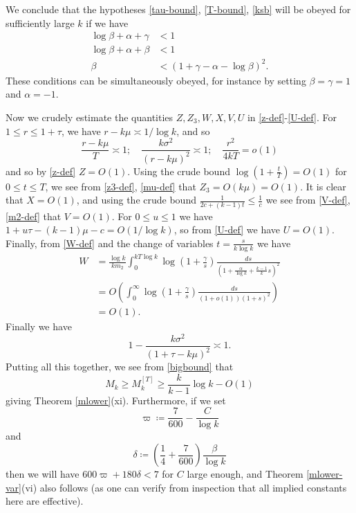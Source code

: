 \documentclass{bmcart}
\theoremstyle{plain}
\theoremstyle{definition}
\renewcommand{\sim}{\asymp}
\begin{document}
We conclude that the hypotheses \eqref{tau-bound}, \eqref{T-bound}, \eqref{ksb} will be obeyed for sufficiently large $k$ if we have
\begin{align*}
\log \beta + \alpha + \gamma &< 1 \\
\log \beta + \alpha + \beta &< 1 \\
\beta &< (1 + \gamma - \alpha - \log \beta)^2.
\end{align*}
These conditions can be simultaneously obeyed, for instance by setting $\beta=\gamma=1$ and $\alpha = -1$.

Now we crudely estimate the quantities $Z,Z_3,W,X,V,U$ in \eqref{z-def}-\eqref{U-def}.  For $1 \leq r \leq 1+\tau$, we have $r-k\mu \sim 1/\log k$, and so
$$ \frac{r-k\mu}{T} \sim 1; \quad \frac{k \sigma^2}{(r-k\mu)^2} \sim 1; \quad \frac{r^2}{4kT} = o(1)$$
and so by \eqref{z-def} $Z = O(1)$.  Using the crude bound $\log(1+\frac{t}{T}) = O(1)$ for $0 \leq t \leq T$, we see from \eqref{z3-def}, \eqref{mu-def} that $Z_3 = O( k \mu ) = O(1)$.  It is clear that $X = O(1)$, and using the crude bound $\frac{1}{2c+(k-1)t} \leq \frac{1}{c}$ we see from \eqref{V-def}, \eqref{m2-def} that $V = O(1)$.  For $0 \leq u \leq 1$ we have $1 + u\tau - (k-1)\mu - c = O(1/\log k)$, so from \eqref{U-def} we have $U=O(1)$.  Finally, from \eqref{W-def} and the change of variables $t = \frac{s}{k \log k}$ we have
\begin{align*}
W &= \frac{\log k}{k m_2} \int_0^{kT\log k} \log\left(1 + \frac{\gamma}{s}\right) \frac{ds}{(1 + \frac{\alpha}{\log k} + \frac{k-1}{k} s)^2} \\
&= O\left( \int_0^\infty \log\left(1+\frac{\gamma}{s}\right) \frac{ds}{(1+o(1))(1+s)^2} \right) \\
&= O(1).
\end{align*}
Finally we have
$$ 1 - \frac{k\sigma^2}{(1+\tau-k\mu)^2} \sim 1.$$
Putting all this together, we see from \eqref{bigbound} that
$$  M_k \geq M_k^{[T]} \geq \frac{k}{k-1} \log k -  O(1)$$
giving Theorem \ref{mlower}(xi).  Furthermore, if we set
$$ \varpi \coloneqq \frac{7}{600} - \frac{C}{\log k}$$
and
$$ \delta \coloneqq \left(\frac{1}{4} + \frac{7}{600}\right) \frac{\beta}{\log k}$$
then we will have $600 \varpi + 180 \delta < 7$ for $C$ large enough, and Theorem \ref{mlower-var}(vi) also follows (as one can verify from inspection that all implied constants here are effective).

\end{document}
